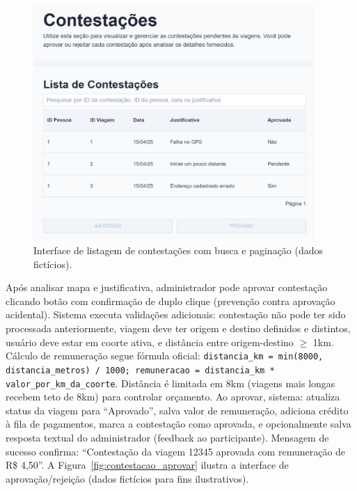  \begin{figure}[htb]
   \centering
   \includegraphics[width=0.95\textwidth]{figuras/contestacoes_listar.png}
   \caption{Interface de listagem de contestações com busca e paginação (dados fictícios).}
   \label{fig:contestacoes_listagem}
 \end{figure}



Após analisar mapa e justificativa, administrador pode aprovar contestação clicando botão com confirmação de duplo clique (prevenção contra aprovação acidental). Sistema executa validações adicionais: contestação não pode ter sido processada anteriormente, viagem deve ter origem e destino definidos e distintos, usuário deve estar em coorte ativa, e distância entre origem-destino $\geq$ 1km. Cálculo de remuneração segue fórmula oficial: \texttt{distancia\_km = min(8000, distancia\_metros) / 1000; remuneracao = distancia\_km * valor\_por\_km\_da\_coorte}. Distância é limitada em 8km (viagens mais longas recebem teto de 8km) para controlar orçamento. Ao aprovar, sistema: atualiza status da viagem para ``Aprovado'', salva valor de remuneração, adiciona crédito à fila de pagamentos, marca a contestação como aprovada, e opcionalmente salva resposta textual do administrador (feedback ao participante). Mensagem de sucesso confirma: ``Contestação da viagem 12345 aprovada com remuneração de R\$ 4,50''. A Figura~\ref{fig:contestacao_aprovar} ilustra a interface de aprovação/rejeição (dados fictícios para fins ilustrativos).

